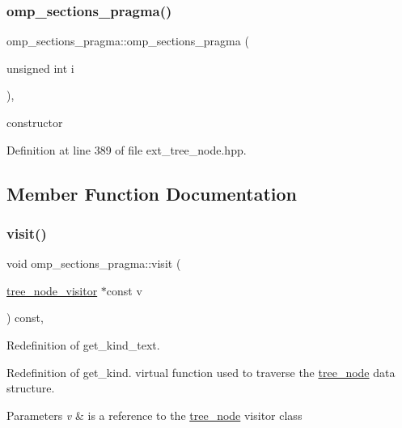 \subsubsection{\texorpdfstring{omp\+\_\+sections\+\_\+pragma()}{omp\_sections\_pragma()}}
{\footnotesize\ttfamily omp\+\_\+sections\+\_\+pragma\+::omp\+\_\+sections\+\_\+pragma (\begin{DoxyParamCaption}\item[{unsigned int}]{i }\end{DoxyParamCaption})\hspace{0.3cm}{\ttfamily [inline]}, {\ttfamily [explicit]}}



constructor 



Definition at line 389 of file ext\+\_\+tree\+\_\+node.\+hpp.



\subsection{Member Function Documentation}
\mbox{\label{structomp__sections__pragma_ae9dcb45b2796afc06a6b4e4233761837}} 
\subsubsection{\texorpdfstring{visit()}{visit()}}
{\footnotesize\ttfamily void omp\+\_\+sections\+\_\+pragma\+::visit (\begin{DoxyParamCaption}\item[{\hyperlink{classtree__node__visitor}{tree\+\_\+node\+\_\+visitor} $\ast$const}]{v }\end{DoxyParamCaption}) const\hspace{0.3cm}{\ttfamily [override]}, {\ttfamily [virtual]}}



Redefinition of get\+\_\+kind\+\_\+text. 

Redefinition of get\+\_\+kind. virtual function used to traverse the \hyperlink{classtree__node}{tree\+\_\+node} data structure. 
\begin{DoxyParams}{Parameters}
{\em v} & is a reference to the \hyperlink{classtree__node}{tree\+\_\+node} visitor class \\
\hline
\end{DoxyParams}


